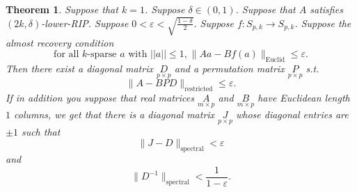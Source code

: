 \documentclass[11pt]{amsart}
\newtheorem{theorem}{Theorem}
\begin{document}
\begin{theorem}
Suppose that $k=1$.  Suppose $\delta \in (0,1)$.  
Suppose that $A$ satisfies $(2k,\delta)$-lower-RIP. 
Suppose $0<\varepsilon < \sqrt{\frac{1-\delta}{2}}$. 
Suppose $f:S_{p,k}\rightarrow S_{p,k}$.
Suppose the almost recovery condition
\begin{equation}\label{ACShyp2}
\text{for all $k$-sparse $a$ with $||a|| \leq 1$,} \ \|Aa - Bf(a)\|_\text{Euclid} \leq \varepsilon .
\end{equation}
 Then there exist a diagonal matrix $\underset{p\times p}{D}$ and a permutation matrix 
 $\underset{p\times p}{P}$ s.t. 
\begin{equation}\label{newnormclaim}
\|A-BPD\|_\text{restricted}\leq \varepsilon.
\end{equation} 
 If in addition you suppose that real matrices $\underset{m \times p}{A}$ and $\underset{m \times p}{B}$ have Euclidean length $1$ columns, we get that there is a diagonal matrix $\underset{p\times p}{J}$ whose diagonal
entries are $\pm1$ such that 
 \begin{equation} \label{deesinversespectralnorm}
 \|J-D\|_\text{spectral}<\varepsilon
 \end{equation}
 and
 \begin{equation} \label{deesinversespectralnorm}
 \|D^{-1}\|_\text{spectral}<\frac{1}{1-\varepsilon}.
 \end{equation}
\end{theorem}
\end{document}
